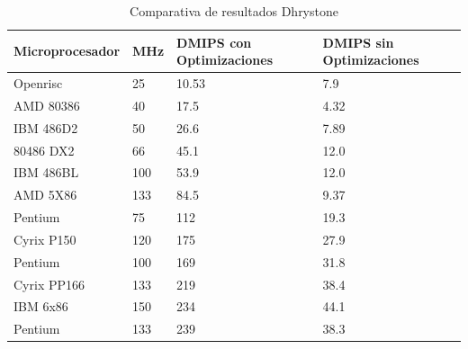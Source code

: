 \begin{table}[h!]
\begin{center}
\begin{tabular}{ |l |l |l |l |}
\hline
\rowcolor[gray]{0.8} Microprocesador& MHz & DMIPS con Optimizaciones & DMIPS sin Optimizaciones \\
\hline
Openrisc		  &25	&10.53	&7.9\\
\hline
AMD 80386         &40   &17.5   &4.32\\
\hline
IBM 486D2         &50   &26.6   &7.89\\
\hline
80486 DX2         &66   &45.1   &12.0\\
\hline
IBM 486BL        &100   &53.9   &12.0\\
\hline
AMD 5X86         &133   &84.5   &9.37\\
\hline
Pentium           &75    &112   &19.3\\
\hline
Cyrix P150       &120    &175   &27.9\\
\hline
Pentium          &100    &169   &31.8\\
\hline
Cyrix PP166      &133    &219   &38.4\\
\hline
IBM 6x86         &150    &234   &44.1\\
\hline
Pentium          &133    &239   &38.3\\
\hline
\end{tabular}
\end{center}
\caption{Comparativa de resultados Dhrystone}
\end{table}

	
	
	
	 
